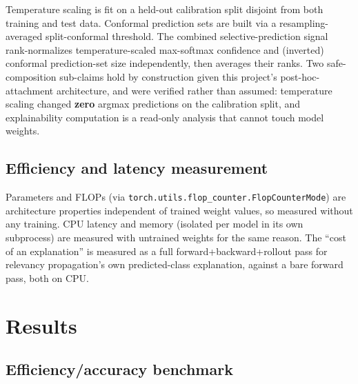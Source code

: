 \documentclass[runningheads]{llncs}
\begin{document}
Temperature scaling is fit on a held-out calibration split disjoint from
both training and test data. Conformal prediction sets are built via a
resampling-averaged split-conformal threshold. The combined
selective-prediction signal rank-normalizes temperature-scaled
max-softmax confidence and (inverted) conformal prediction-set size
independently, then averages their ranks. Two safe-composition
sub-claims hold by construction given this project's post-hoc-attachment
architecture, and were verified rather than assumed: temperature scaling
changed \textbf{zero} argmax predictions on the calibration split, and
explainability computation is a read-only analysis that cannot touch
model weights.

\subsection{Efficiency and latency measurement}

Parameters and FLOPs (via \texttt{torch.utils.flop\_counter.FlopCounterMode})
are architecture properties independent of trained weight values, so
measured without any training. CPU latency and memory (isolated per model
in its own subprocess) are measured with untrained weights for the same
reason. The ``cost of an explanation'' is measured as a full
forward+backward+rollout pass for relevancy propagation's own
predicted-class explanation, against a bare forward pass, both on CPU.

\section{Results}

\subsection{Efficiency/accuracy benchmark}
\end{document}
